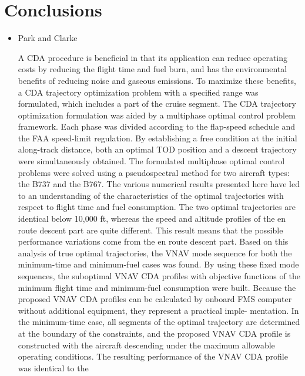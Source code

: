 \documentclass{aer1315-pretty}
\begin{document}

\section{Conclusions}  \label{sec:conclusion}

\begin{itemize}

\item Park and Clarke \cite{Park:2015} 

A CDA procedure is beneficial in that its application can reduce
operating costs by reducing the flight time and fuel burn, and has the
environmental benefits of reducing noise and gaseous emissions. To
maximize these benefits, a CDA trajectory optimization problem
with a specified range was formulated, which includes a part of the
cruise segment. The CDA trajectory optimization formulation was
aided by a multiphase optimal control problem framework. Each
phase was divided according to the flap-speed schedule and the FAA
speed-limit regulation. By establishing a free condition at the initial
along-track distance, both an optimal TOD position and a descent
trajectory were simultaneously obtained.
The formulated multiphase optimal control problems were solved
using a pseudospectral method for two aircraft types: the B737 and
the B767. The various numerical results presented here have led to an
understanding of the characteristics of the optimal trajectories with
respect to flight time and fuel consumption. The two optimal
trajectories are identical below 10,000 ft, whereas the speed and
altitude profiles of the en route descent part are quite different. This
result means that the possible performance variations come from the
en route descent part.
Based on this analysis of true optimal trajectories, the VNAV mode
sequence for both the minimum-time and minimum-fuel cases was
found. By using these fixed mode sequences, the suboptimal VNAV
CDA profiles with objective functions of the minimum flight time
and minimum-fuel consumption were built. Because the proposed
VNAV CDA profiles can be calculated by onboard FMS computer
without additional equipment, they represent a practical imple-
mentation. In the minimum-time case, all segments of the optimal
trajectory are determined at the boundary of the constraints, and the
proposed VNAV CDA profile is constructed with the aircraft
descending under the maximum allowable operating conditions. The
resulting performance of the VNAV CDA profile was identical to the

\end{itemize}
\end{document}
